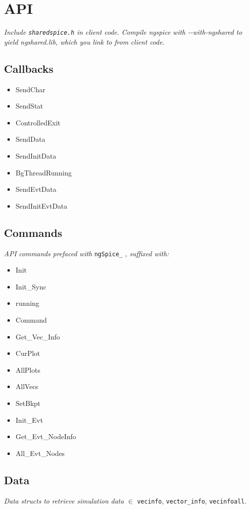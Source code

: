 \section{API}

\textit{Include \texttt{sharedspice.h} in client code. Compile ngspice with -{}-with-ngshared to yield ngshared.lib, which you link to from client code.}\\


\subsection*{Callbacks}
{\footnotesize \begin{multicols}{2}
\begin{itemize}[label={}]
    \item SendChar 
    \item SendStat
    \item ControlledExit
    \item SendData
    \item SendInitData
    \item BgThreadRunning
    \item SendEvtData
    \item SendInitEvtData
\end{itemize}\end{multicols}
}

\subsection*{Commands}
\textit{API commands prefaced with } \texttt{ngSpice\_} \textit{, suffixed with:}
{\footnotesize \begin{multicols}{2}
\begin{itemize}[label={}]
    \item Init
    \item Init\_Sync
    \item running
    \item Command
    \item Get\_Vec\_Info
    \item CurPlot
    \item AllPlots
    \item AllVecs
    \item SetBkpt
    \item Init\_Evt
    \item Get\_Evt\_NodeInfo
    \item All\_Evt\_Nodes
\end{itemize}\end{multicols}
}


\subsection*{Data}
\textit{Data structs to retrieve simulation data $\in$} \texttt{vecinfo}, \texttt{vector\_info}, \texttt{vecinfoall}. \\
\\[75mm]